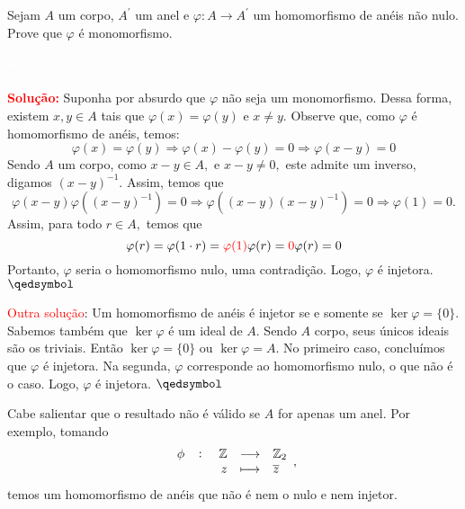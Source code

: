 \documentclass[11pt,a4paper]{article}
\newcounter{exercicio}[section]
\newcommand{\solucao}[1]{
\textbf{\textcolor{white}{oi}\\ \\ \textcolor{red}{Solução:}} #1}
\begin{document}
 Sejam $A$ um corpo, $A^{\prime}$ um anel e $\varphi \colon A \to A^{\prime}$ um homomorfismo de anéis não nulo. Prove que $\varphi$ é monomorfismo.
\solucao{
Suponha por absurdo que $\varphi$ não seja um monomorfismo. Dessa forma, existem $x, y \in A$ tais que $\varphi(x) = \varphi(y)$ e $x \neq y.$ Observe que, como $\varphi$ é homomorfismo de anéis, temos:
\[
\varphi(x) = \varphi(y) \Rightarrow \varphi(x) - \varphi(y) = 0 \Rightarrow \varphi(x - y) = 0
\]
Sendo $A$ um corpo, como $x - y \in A,$ e $x - y \neq 0,$ este admite um inverso, digamos $(x-y)^{-1}.$ Assim, temos que
\[
\varphi(x-y)\varphi((x-y)^{-1}) = 0 \Rightarrow \varphi((x-y)(x-y)^{-1}) = 0 \Rightarrow \varphi(1) = 0.
\]
Assim, para todo $r \in A,$ temos que
\[
\varphi(r) = \varphi(1 \cdot r) = \textcolor{red}{\varphi(1)} \varphi(r) = \textcolor{red}{0} \varphi(r) = 0
\]
Portanto, $\varphi$ seria o homomorfismo nulo, uma contradição. Logo,  $\varphi$ é injetora. $\qedsymbol$

\bigskip
\noindent
\textcolor{red}{Outra solução}: Um homomorfismo de anéis é injetor se e somente se $\ker \varphi = \{ 0 \}.$ Sabemos também que $\ker \varphi$ é um ideal de $A.$ Sendo $A$ corpo, seus únicos ideais são os triviais. Então $\ker \varphi = \{ 0 \}$ ou $\ker \varphi = A.$ No primeiro caso, concluímos que $\varphi$ é injetora. Na segunda, $\varphi$ corresponde ao homomorfismo nulo, o que não é o caso. Logo, $\varphi$ é injetora. $\qedsymbol$

\medskip
\noindent
Cabe salientar que o resultado não é válido se $A$ for apenas um anel. Por exemplo, tomando
\[
\fullfunction{\phi}{\mathbb{Z}}{\mathbb{Z}_2}{z}{\overline{z}},
\]
temos um homomorfismo de anéis que não é nem o nulo e nem injetor.
}
\end{document}
